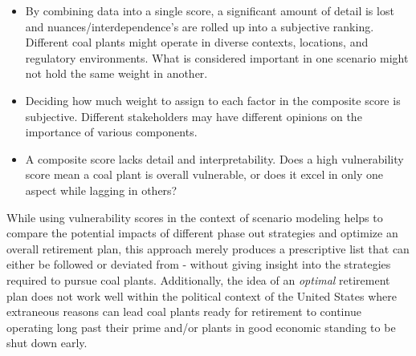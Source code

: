 \begin{itemize}
    \item By combining data into a single score, a significant amount of detail is lost and nuances/interdependence's are 
    rolled up into a subjective ranking. Different coal plants might operate in diverse contexts, locations, 
    and regulatory environments. What is considered important in one scenario might not hold the same weight in another.
    \item Deciding how much weight to assign to each factor in the composite score is subjective. Different stakeholders may have 
    different opinions on the importance of various components.
    \item A composite score lacks detail and interpretability. Does a high vulnerability score mean a coal plant is overall vulnerable, or does it excel in only one aspect while lagging in others?
\end{itemize}

While using vulnerability scores in the context of scenario modeling helps to compare the potential impacts of different phase out strategies and 
optimize an overall retirement plan, this approach merely produces a prescriptive list that can either be followed or deviated from - without giving 
insight into the strategies required to pursue coal plants. Additionally, the idea of an \textit{optimal} retirement plan does not work well 
within the political context of the United States where extraneous reasons can lead coal plants ready for retirement to continue operating long 
past their prime and/or plants in good economic standing to be shut down early. 